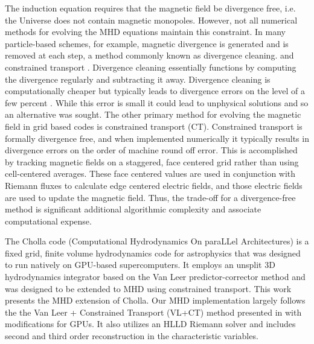 The induction equation requires that the magnetic field be divergence free, i.e. the Universe does not contain magnetic monopoles. However, not all numerical methods for evolving the MHD equations maintain this constraint. In many particle-based schemes, for example, magnetic divergence is generated and is removed at each step, a method commonly known as divergence cleaning\citep{dedner_hyperbolic_2002}. and constrained transport \citep{evans_1988}. Divergence cleaning essentially functions by computing the divergence regularly and subtracting it away. Divergence cleaning is computationally cheaper but typically leads to divergence errors on the level of a few percent \citep{pakmor_magnetizing_2020,van_de_voort_effect_2021}. While this error is small it could lead to unphysical solutions and so an alternative was sought. The other primary method for evolving the magnetic field in grid based codes is constrained transport (CT). Constrained transport is formally divergence free, and when implemented numerically it typically results in divergence errors on the order of machine round off error\citep{evans_1988,stone_athena_2008, stone_2009}. This is accomplished by tracking magnetic fields on a staggered, face centered grid rather than using cell-centered averages. These face centered values are used in conjunction with Riemann fluxes to calculate edge centered electric fields, and those electric fields are used to update the magnetic field\citep{evans_1988,stone_athena_2008, stone_2009}. Thus, the trade-off for a divergence-free method is significant additional algorithmic complexity and associate computational expense.

The Cholla code (Computational Hydrodynamics On paraLLel Architectures)\citep{schneider_2015} is a fixed grid, finite volume hydrodynamics code for astrophysics that was designed to run natively on GPU-based supercomputers. It employs an unsplit 3D hydrodynamics integrator based on the Van Leer predictor-corrector method \citep{falle_1991, van_leer_2006} and was designed to be extended to MHD using constrained transport\citep{evans_1988, stone_athena_2008}. This work presents the MHD extension of Cholla. Our MHD implementation largely follows the the Van Leer + Constrained Transport (VL+CT) method presented in \cite{stone_2009} with modifications for GPUs. It also utilizes an HLLD Riemann solver\citep{hlld_2005} and includes second\citep{stone_2009} and third\citep{felker_2018} order reconstruction in the characteristic variables\citep{stone_athena_2008}.

